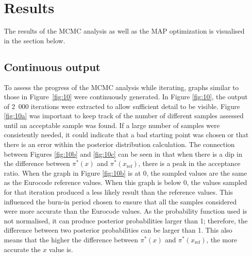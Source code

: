 \chapter{Results} \label{results}
The results of the MCMC analysis as well as the MAP optimization is visualised in the section below.
\section{Continuous output}
To assess the progress of the MCMC analysis while iterating, graphs similar to those in Figure~\ref{fig:10} were continuously generated. 
In Figure \ref{fig:10}, the output of 2~000 iterations were extracted to allow sufficient detail to be visible.
Figure \ref{fig:10a} was important to keep track of the number of different samples assessed until an acceptable sample was found.
If a large number of samples were consistently needed, it could indicate that a bad starting point was chosen or that there is an error within the posterior distribution calculation.
The connection between Figures \ref{fig:10b} and \ref{fig:10c} can be seen in that when there is a dip in the difference between $\pi^*(x)$ and $\pi^*(x_{\text{ref}})$, there is a peak in the acceptance ratio.
When the graph in Figure \ref{fig:10b} is at 0, the sampled values are the same as the Eurocode reference values.
When this graph is below 0, the values sampled for that iteration produced a less likely result than the reference values.
This influenced the burn-in period chosen to ensure that all the samples considered were more accurate than the Eurocode values.
As the probability function used is not normalised, it can produce posterior probabilities larger than 1; therefore, the difference between two posterior probabilities can be larger than 1.
This also means that the higher the difference between $\pi^*(x)$ and $\pi^*(x_{\text{ref}})$, the more accurate the $x$ value is.

